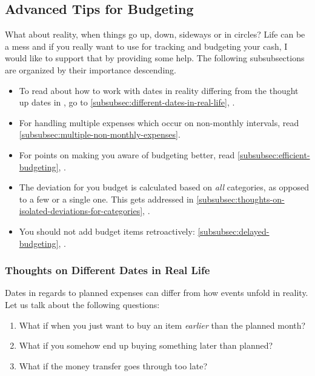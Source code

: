 \subsection{Advanced Tips for Budgeting}
\label{subsec:advanced-tips-for-budgeting}

What about reality, when things go up, down, sideways or in circles?
Life can be a mess and if you really want to use \tfn for tracking and budgeting your cash, I would like to support that by providing some help.
The following subsubsections are organized by their importance descending.
\begin{itemize}
	\item To read about how to work with dates in reality differing from the thought up dates in \tfn, go to \autoref{subsubsec:different-dates-in-real-life}, .
	\item For handling multiple expenses which occur on non-monthly intervals, read \autoref{subsubsec:multiple-non-monthly-expenses}.
	\item For points on making you aware of budgeting better, read \autoref{subsubsec:efficient-budgeting}, .
	\item The deviation for you budget is calculated based on \emph{all} categories, as opposed to a few or a single one.
	This gets addressed in \autoref{subsubsec:thoughts-on-isolated-deviations-for-categories}, .
	\item You should not add budget items retroactively: 	\autoref{subsubsec:delayed-budgeting}, .
\end{itemize}

\subsubsection{Thoughts on Different Dates in Real Life}
\label{subsubsec:different-dates-in-real-life}

Dates in regards to planned expenses can differ from how events unfold in reality.
Let us talk about the following questions:
\begin{enumerate}
	\item What if when you just want to buy an item \emph{earlier} than the planned month?
	\item What if you somehow end up buying something later than planned?
	\item What if the money transfer goes through too late?
\end{enumerate}

